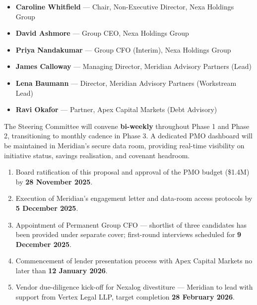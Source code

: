 \documentclass[11pt,a4paper]{article}
\begin{document}
\begin{itemize}[leftmargin=1.4em,itemsep=4pt]
  \item[\textcolor{GoldAccent}{\faUser}] \textbf{Caroline Whitfield} — Chair, Non-Executive Director, Nexa Holdings Group
  \item[\textcolor{GoldAccent}{\faUser}] \textbf{David Ashmore} — Group CEO, Nexa Holdings Group
  \item[\textcolor{GoldAccent}{\faUser}] \textbf{Priya Nandakumar} — Group CFO (Interim), Nexa Holdings Group
  \item[\textcolor{GoldAccent}{\faUser}] \textbf{James Calloway} — Managing Director, Meridian Advisory Partners (Lead)
  \item[\textcolor{GoldAccent}{\faUser}] \textbf{Lena Baumann} — Director, Meridian Advisory Partners (Workstream Lead)
  \item[\textcolor{GoldAccent}{\faUser}] \textbf{Ravi Okafor} — Partner, Apex Capital Markets (Debt Advisory)
\end{itemize}

\vspace{8pt}
The Steering Committee will convene \textbf{bi-weekly} throughout Phase 1 and Phase 2,
transitioning to monthly cadence in Phase 3. A dedicated PMO dashboard will be maintained in
Meridian's secure data room, providing real-time visibility on initiative status, savings
realisation, and covenant headroom.

\vspace{12pt}

\begin{tcolorbox}[execbox={Recommended Immediate Next Steps}]
\small
\begin{enumerate}[leftmargin=1.4em,itemsep=4pt,topsep=4pt]
  \item Board ratification of this proposal and approval of the PMO budget (\$1.4M) by
    \textbf{28 November 2025}.
  \item Execution of Meridian's engagement letter and data-room access protocols by
    \textbf{5 December 2025}.
  \item Appointment of Permanent Group CFO — shortlist of three candidates has been provided
    under separate cover; first-round interviews scheduled for \textbf{9 December 2025}.
  \item Commencement of lender presentation process with Apex Capital Markets no later than
    \textbf{12 January 2026}.
  \item Vendor due-diligence kick-off for Nexalog divestiture — Meridian to lead with
    support from Vertex Legal LLP, target completion \textbf{28 February 2026}.
\end{enumerate}
\end{tcolorbox}
\end{document}
